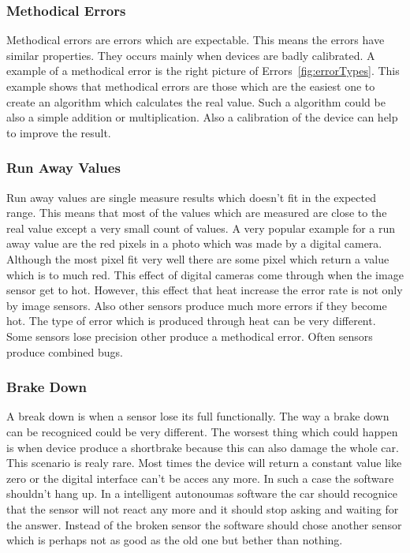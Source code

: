 \subsubsection{Methodical Errors}
Methodical errors are errors which are expectable.
This means the errors have similar properties.
They occurs mainly when devices are badly calibrated.
A example of a methodical error is the right picture of Errors~\ref{fig:errorTypes}.
This example shows that methodical errors are those which are the easiest one to create an algorithm which calculates the real value.
Such a algorithm could be also a simple addition or multiplication.
Also a calibration of the device can help to improve the result.


\subsubsection{Run Away Values}
Run away values are single measure results which doesn't fit in the expected range.
This means that most of the values which are measured are close to the real value except a very small count of values.
A very popular example for a run away value are the red pixels in a photo which was made by a digital camera.
Although the most pixel fit very well there are some pixel which return a value which is to much red.
This effect of digital cameras come through when the image sensor get to hot.
However, this effect that heat increase the error rate is not only by image sensors.
Also other sensors produce much more errors if they become hot.
The type of error which is produced through heat can be very different.
Some sensors lose precision other produce a methodical error.
Often sensors produce combined bugs.


\subsubsection{Brake Down}
A break down is when a sensor lose its full functionally.
The way a brake down can be recogniced could be very different.
The worsest thing which could happen is when device produce a shortbrake because this can also damage the whole car.
This scenario is realy rare.
Most times the device will return a constant value like zero or the digital interface can't be acces any more.
In such a case the software shouldn't hang up.
In a intelligent autonoumas software the car should recognice that the sensor will not react any more and it should stop asking and waiting for the answer.
Instead of the broken sensor the software should chose another sensor which is perhaps not as good as the old one but bether than nothing.


